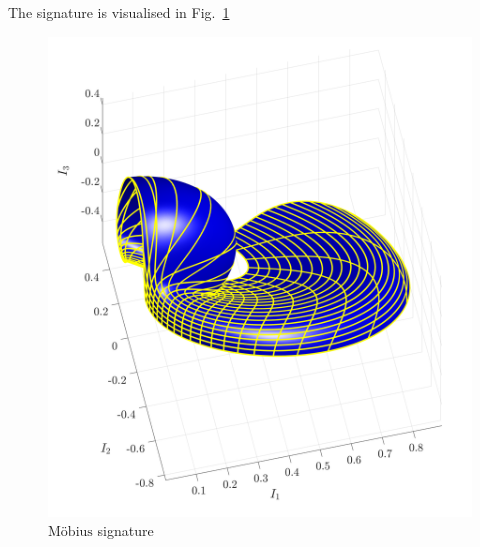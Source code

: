 \documentclass[11pt]{article}
\begin{document}
The signature is visualised in Fig.~\ref{fig:mobiussignature}
\begin{figure}
  \centering
    \includegraphics[width=12cm]{figures/Mobius_signature}
    \caption{$\text{M{\"o}bius}$ signature}
  \label{fig:mobiussignature}
\end{figure}
\end{document}
